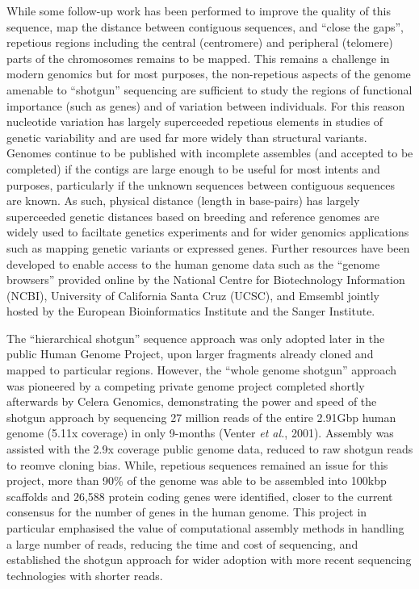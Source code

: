 While some follow-up work has been performed to improve the quality of this sequence, map the distance between contiguous sequences, and ``close the gaps'', repetious regions including the central (centromere) and peripheral (telomere) parts of the chromosomes remains to be mapped. This remains a challenge in modern genomics but for most purposes, the non-repetious aspects of the genome amenable to ``shotgun'' sequencing are sufficient to study the regions of functional importance (such as genes) and of variation between individuals. For this reason nucleotide variation has largely superceeded repetious elements in studies of genetic variability and are used far more widely than structural variants. Genomes continue to be published with incomplete assembles (and accepted to be completed) if the contigs are large enough to be useful for most intents and purposes, particularly if the unknown sequences between contiguous sequences are known. As such, physical distance (length in base-pairs) has largely superceeded genetic distances based on breeding and reference genomes are widely used to faciltate genetics experiments and for wider genomics applications such as mapping genetic variants or expressed genes. Further resources have been developed to enable access to the human genome data such as the ``genome browsers'' provided online by the National Centre for Biotechnology Information (NCBI), University of California Santa Cruz (\gls{UCSC}), and Emsembl jointly hosted by the European Bioinformatics Institute and the Sanger Institute. 

The ``hierarchical shotgun'' sequence approach was only adopted later in the public Human Genome Project, upon larger fragments already cloned and mapped to particular regions. However, the ``whole genome shotgun'' approach was pioneered by a competing private genome project completed shortly afterwards by Celera Genomics, demonstrating the power and speed of the shotgun approach by sequencing 27 million reads of the entire 2.91Gbp human genome (5.11x coverage) in only 9-months (Venter \textit{et al.}, 2001). Assembly was assisted with the 2.9x coverage public genome data, reduced to raw shotgun reads to reomve cloning bias. While, repetious sequences remained an issue for this project, more than 90\% of the genome was able to be assembled into 100kbp scaffolds and 26,588 protein coding genes were identified, closer to the current consensus for the number of genes in the human genome. This project in particular emphasised the value of computational assembly methods in handling a large number of reads, reducing the time and cost of sequencing, and established the shotgun approach for wider adoption with more recent sequencing technologies with shorter reads.

